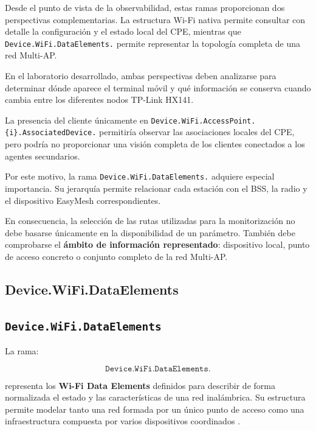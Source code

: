 Desde el punto de vista de la observabilidad, estas ramas proporcionan
dos perspectivas complementarias. La estructura Wi-Fi nativa permite
consultar con detalle la configuración y el estado local del CPE,
mientras que \texttt{Device.WiFi.DataElements.} permite representar la
topología completa de una red Multi-AP.

En el laboratorio desarrollado, ambas perspectivas deben analizarse para
determinar dónde aparece el terminal móvil y qué información se conserva
cuando cambia entre los diferentes nodos TP-Link HX141.

La presencia del cliente únicamente en
\texttt{Device.WiFi.AccessPoint.\{i\}.AssociatedDevice.} permitiría
observar las asociaciones locales del CPE, pero podría no proporcionar
una visión completa de los clientes conectados a los agentes secundarios.

Por este motivo, la rama
\texttt{Device.WiFi.DataElements.} adquiere especial importancia. Su
jerarquía permite relacionar cada estación con el BSS, la radio y el
dispositivo EasyMesh correspondientes.

En consecuencia, la selección de las rutas utilizadas para la
monitorización no debe basarse únicamente en la disponibilidad de un
parámetro. También debe comprobarse el
\textbf{ámbito de información representado}: dispositivo local, punto de
acceso concreto o conjunto completo de la red Multi-AP.

\subsection{Device.WiFi.DataElements}
\label{subsec:device-wifi-dataelements}


\subsection{\texttt{Device.WiFi.DataElements}}
\label{subsec:device-wifi-dataelements}

La rama:

\[
    \texttt{Device.WiFi.DataElements.}
\]

representa los \textbf{Wi-Fi Data Elements} definidos para describir de
forma normalizada el estado y las características de una red
inalámbrica. Su estructura permite modelar tanto una red formada por un
único punto de acceso como una infraestructura compuesta por varios
dispositivos coordinados \cite{bbf_tr181}.

